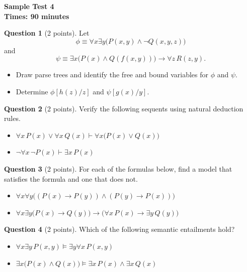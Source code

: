 \documentclass[12pt]{article}
\begin{document}
\begin{center}
    \textbf{Sample Test 4} \\
    \textbf{Times: 90 minutes}
\end{center}

\vspace{0.3cm}

\noindent\textbf{Question 1} (2 points). Let
\[
\phi \equiv \forall x \exists y \bigl( P(x, y) \wedge \neg Q(x, y, z) \bigr)
\]
and
\[
\psi \equiv \exists x \bigl( P(x) \wedge Q(f(x, y)) \bigr) \rightarrow \forall z\, R(z, y).
\]
\begin{itemize}
    \item[a)] Draw parse trees and identify the free and bound variables for $\phi$ and $\psi$.
    \item[b)] Determine $\phi[h(z)/z]$ and $\psi[g(x)/y]$.
\end{itemize}

\vspace{0.2cm}

\noindent\textbf{Question 2} (2 points). Verify the following sequents using natural deduction rules.
\begin{itemize}
    \item[a)] $\forall x\, P(x) \vee \forall x\, Q(x) \vdash \forall x \bigl( P(x) \vee Q(x) \bigr)$
    \item[b)] $\neg \forall x\, \neg P(x) \vdash \exists x\, P(x)$
\end{itemize}

\vspace{0.2cm}

\noindent\textbf{Question 3} (2 points). For each of the formulas below, find a model that satisfies the formula and one that does not.
\begin{itemize}
    \item[a)] $\forall x \forall y \bigl( (P(x) \rightarrow P(y)) \wedge (P(y) \rightarrow P(x)) \bigr)$
    \item[b)] $\forall x \exists y \bigl( P(x) \rightarrow Q(y) \bigr) \rightarrow \bigl( \forall x\, P(x) \rightarrow \exists y\, Q(y) \bigr)$
\end{itemize}

\vspace{0.2cm}

\noindent\textbf{Question 4} (2 points). Which of the following semantic entailments hold?
\begin{itemize}
    \item[a)] $\forall x \exists y\, P(x, y) \models \exists y \forall x\, P(x, y)$
    \item[b)] $\exists x \bigl( P(x) \wedge Q(x) \bigr) \models \exists x\, P(x) \wedge \exists x\, Q(x)$
\end{itemize}
\end{document}
